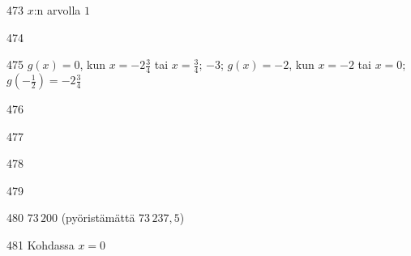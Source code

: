 \begin{Vastaus}{473}
$x$:n arvolla $1$
	
\end{Vastaus}
\begin{Vastaus}{474}
  
\end{Vastaus}
\begin{Vastaus}{475}
	$g(x)=0$, kun $x=-2\frac{3}{4}$ tai $x=\frac{3}{4}$; $-3$; $g(x)=-2$, kun $x=-2$ tai $x=0$; $g\left(-\frac{1}{2}\right)=-2\frac{3}{4}$
	
\end{Vastaus}
\begin{Vastaus}{476}
	
\end{Vastaus}
\begin{Vastaus}{477}
	
\end{Vastaus}
\begin{Vastaus}{478}
	
\end{Vastaus}
\begin{Vastaus}{479}
\end{Vastaus}
\begin{Vastaus}{480}
	$73\,200$ (pyöristämättä $73\,237,5$)
	
\end{Vastaus}
\begin{Vastaus}{481}
Kohdassa $x=0$
\end{Vastaus}
